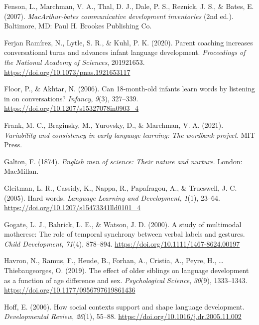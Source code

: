 \documentclass[
  english,
  man,floatsintext]{apa6}
\begin{document}
\leavevmode\hypertarget{ref-fenson_macarthur-bates_2007}{}%
Fenson, L., Marchman, V. A., Thal, D. J., Dale, P. S., Reznick, J. S., \& Bates, E. (2007). \emph{MacArthur-bates communicative development inventories} (2nd ed.). Baltimore, MD: Paul H. Brookes Publishing Co.

\leavevmode\hypertarget{ref-ferjan_ramirez_parent_2020}{}%
Ferjan Ramírez, N., Lytle, S. R., \& Kuhl, P. K. (2020). Parent coaching increases conversational turns and advances infant language development. \emph{Proceedings of the National Academy of Sciences}, 201921653. \url{https://doi.org/10.1073/pnas.1921653117}

\leavevmode\hypertarget{ref-floor_can_2006}{}%
Floor, P., \& Akhtar, N. (2006). Can 18-month-old infants learn words by listening in on conversations? \emph{Infancy}, \emph{9}(3), 327--339. \url{https://doi.org/10.1207/s15327078in0903_4}

\leavevmode\hypertarget{ref-frank_variability_2021}{}%
Frank, M. C., Braginsky, M., Yurovsky, D., \& Marchman, V. A. (2021). \emph{Variability and consistency in early language learning: The wordbank project}. MIT Press.

\leavevmode\hypertarget{ref-galton_english_1874}{}%
Galton, F. (1874). \emph{English men of science: Their nature and nurture}. London: MacMillan.

\leavevmode\hypertarget{ref-gleitman_hard_2005}{}%
Gleitman, L. R., Cassidy, K., Nappa, R., Papafragou, A., \& Trueswell, J. C. (2005). Hard words. \emph{Language Learning and Development}, \emph{1}(1), 23--64. \url{https://doi.org/10.1207/s15473341lld0101_4}

\leavevmode\hypertarget{ref-gogate_study_2000}{}%
Gogate, L. J., Bahrick, L. E., \& Watson, J. D. (2000). A study of multimodal motherese: The role of temporal synchrony between verbal labels and gestures. \emph{Child Development}, \emph{71}(4), 878--894. \url{https://doi.org/10.1111/1467-8624.00197}

\leavevmode\hypertarget{ref-havron_effect_2019}{}%
Havron, N., Ramus, F., Heude, B., Forhan, A., Cristia, A., Peyre, H., \ldots{} Thiebaugeorges, O. (2019). The effect of older siblings on language development as a function of age difference and sex. \emph{Psychological Science}, \emph{30}(9), 1333--1343. \url{https://doi.org/10.1177/0956797619861436}

\leavevmode\hypertarget{ref-hoff_how_2006}{}%
Hoff, E. (2006). How social contexts support and shape language development. \emph{Developmental Review}, \emph{26}(1), 55--88. \url{https://doi.org/10.1016/j.dr.2005.11.002}
\end{document}
